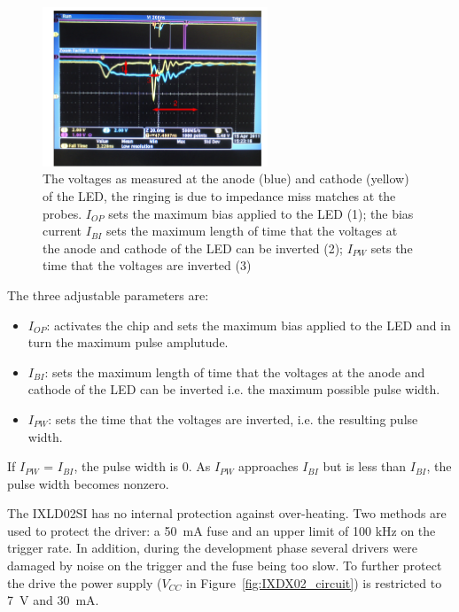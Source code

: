 \documentclass[12pt]{report}
\begin{document}
\begin{figure}[htbp]
	\begin{center}
		\includegraphics[width=0.6\textwidth]{driver_voltages}
		\caption{The voltages as measured at the anode (blue) and cathode (yellow) of the LED, the ringing is due to impedance miss matches at the probes. $I_{OP}$ sets the maximum bias applied to the LED (1); the bias current $I_{BI}$ sets the maximum length of time that the voltages at the anode and cathode of the LED can be inverted (2); $I_{PW}$ sets the time that the voltages are inverted (3)}
		\label{fig:LEDDriverScope}
	\end{center}
\end{figure}


The three adjustable parameters are: 
\begin{itemize}
	\item $I_{OP}$: activates the chip and sets the maximum bias applied to the LED and in turn the maximum pulse amplutude.
	\item $I_{BI}$: sets the maximum length of time that the voltages at the anode and cathode of the LED can be inverted i.e. the maximum possible pulse width.
	\item $I_{PW}$: sets the time that the voltages are inverted, i.e. the resulting pulse width.
\end{itemize}

If $I_{PW}$ = $I_{BI}$, the pulse width is 0. As $I_{PW}$ approaches $I_{BI}$ but is less than $I_{BI}$, the pulse width becomes nonzero. 

The IXLD02SI has no internal protection against over-heating. Two methods are used to protect the driver: a 50~mA fuse and an upper limit of 100 kHz on the trigger rate. In addition, during the development phase several drivers were damaged by noise on the trigger and the fuse being too slow. To further protect the drive the power supply ($V_{CC}$ in Figure~\ref{fig:IXDX02_circuit}) is restricted to 7~V and 30~mA. 
\end{document}
